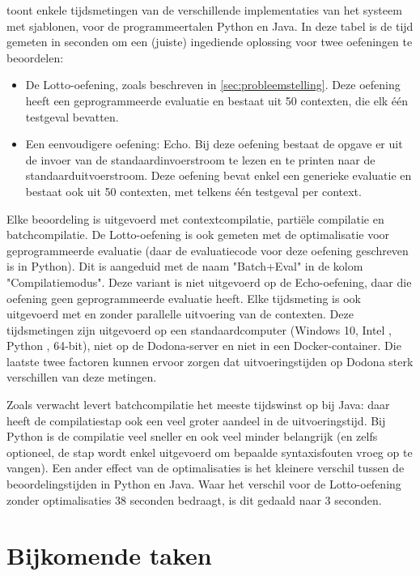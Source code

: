  toont enkele tijdsmetingen van de verschillende implementaties van het systeem met sjablonen, voor de programmeertalen Python en Java.
In deze tabel is de tijd gemeten in seconden om een (juiste) ingediende oplossing voor twee oefeningen te beoordelen:

\begin{itemize}
    \item De Lotto-oefening, zoals beschreven in \cref{sec:probleemstelling}.
    Deze oefening heeft een geprogrammeerde evaluatie en bestaat uit 50 contexten, die elk één testgeval bevatten.
    \item Een eenvoudigere oefening: Echo.
    Bij deze oefening bestaat de opgave er uit de invoer van de standaardinvoerstroom te lezen en te printen naar de standaarduitvoerstroom.
    Deze oefening bevat enkel een generieke evaluatie en bestaat ook uit 50 contexten, met telkens één testgeval per context.
\end{itemize}

Elke beoordeling is uitgevoerd met contextcompilatie, partiële compilatie en batchcompilatie.
De Lotto-oefening is ook gemeten met de optimalisatie voor geprogrammeerde evaluatie (daar de evaluatiecode voor deze oefening geschreven is in Python).
Dit is aangeduid met de naam "Batch+Eval" in de kolom "Compilatiemodus".
Deze variant is niet uitgevoerd op de Echo-oefening, daar die oefening geen geprogrammeerde evaluatie heeft.
Elke tijdsmeting is ook uitgevoerd met en zonder parallelle uitvoering van de contexten.
Deze tijdsmetingen zijn uitgevoerd op een standaardcomputer (Windows 10, Intel , Python , 64-bit), niet op de Dodona-server en niet in een Docker-container.
Die laatste twee factoren kunnen ervoor zorgen dat uitvoeringstijden op Dodona sterk verschillen van deze metingen.

Zoals verwacht levert batchcompilatie het meeste tijdswinst op bij Java: daar heeft de compilatiestap ook een veel groter aandeel in de uitvoeringstijd.
Bij Python is de compilatie veel sneller en ook veel minder belangrijk (en zelfs optioneel, de stap wordt enkel uitgevoerd om bepaalde syntaxisfouten vroeg op te vangen).
Een ander effect van de optimalisaties is het kleinere verschil tussen de beoordelingstijden in Python en Java.
Waar het verschil voor de Lotto-oefening zonder optimalisaties 38 seconden bedraagt, is dit gedaald naar 3 seconden.


\section{Bijkomende taken}\label{sec:andere-taken}

